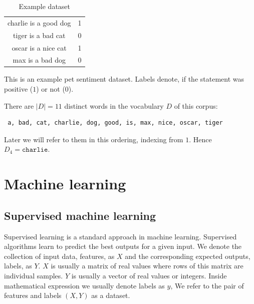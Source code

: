     \begin{table}[h]
        \centering
        \begin{tabular}{c|c}
        \hline
            charlie is a good dog & 1 \\
            tiger is a bad cat & 0 \\
            oscar is a nice cat & 1 \\
            max is a bad dog & 0 \\
        \end{tabular}
        \caption{Example dataset}
        \label{tab:example:dataset}

    \end{table}
    

    This is an example pet sentiment dataset. Labels denote, if the statement was positive ($1$) or not ($0$).
    
    There are $|D|=11$ distinct words in the vocabulary $D$ of this corpus: 
    \begin{verbatim} a, bad, cat, charlie, dog, good, is, max, nice, oscar, tiger \end{verbatim}
    
    Later we will refer to them in this ordering, indexing from $1$. Hence $D_4=\mathtt{charlie}$.

\section{Machine learning}
    
    \* %
    
    \subsection{Supervised machine learning}
    
    Supervised learning is a standard approach in machine learning. 
    Supervised algorithms learn to predict the best outputs for a given input.
    We denote the collection of input data, features, as $X$ and the corresponding expected outputs, labels, as $Y$.
    $X$ is usually a matrix of real values where rows of this matrix are individual samples.
    $Y$ is usually a vector of real values or integers. 
    Inside mathematical expression we usually denote labels as $y$,
    We refer to the pair of features and labels $(X, Y)$ as a dataset.
    
